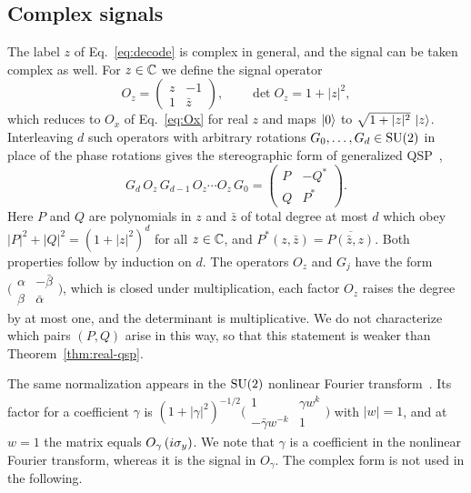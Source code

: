 \subsection{Complex signals}
\label{subsec:complex}

The label $z$ of Eq.~\eqref{eq:decode} is complex in general, and
the signal can be taken complex as well.  For $z\in\mathbb{C}$ we define
the signal operator
\begin{equation}
	O_z=\begin{pmatrix} z & -1 \\ 1 & \bar z\end{pmatrix},
	\qquad \det O_z=1+|z|^2,
	\label{eq:Oz}
\end{equation}
which reduces to $O_x$ of Eq.~\eqref{eq:Ox} for real $z$ and maps
$\ket{0}$ to $\sqrt{1+|z|^2}\,\ket{z}$.  Interleaving $d$ such
operators with arbitrary rotations $G_0,\dots,G_d\in\mathrm{SU}(2)$ in
place of the phase rotations gives the stereographic form of
generalized QSP~\cite{MotlaghWiebe2023},
\begin{equation}
	G_d\,O_z\,G_{d-1}\,O_z\cdots O_z\,G_0
	=\begin{pmatrix} P & -Q^*\\ Q & P^*\end{pmatrix}.
	\label{eq:gen-qsp-form}
\end{equation}
Here $P$ and $Q$ are polynomials in $z$ and $\bar z$ of total
degree at most $d$ which obey $|P|^2+|Q|^2=(1+|z|^2)^d$ for all
$z\in\mathbb{C}$, and $P^*(z,\bar z)=\overline{P(\bar z,z)}$.  Both
properties follow by induction on $d$.  The operators $O_z$ and
$G_j$ have the form
$\bigl(\begin{smallmatrix}\alpha&-\bar\beta\\
\beta&\bar\alpha\end{smallmatrix}\bigr)$, which is closed under
multiplication, each factor $O_z$ raises the degree by at most
one, and the determinant is multiplicative.  We do not
characterize which pairs $(P,Q)$ arise in this way, so that this
statement is weaker than Theorem~\ref{thm:real-qsp}.

The same normalization appears in the $\mathrm{SU}(2)$ nonlinear Fourier
transform~\cite{AlexisMnatsakanyanThiele2024,AlexisBeckerEtAl2026,Laneve2025b}.
Its factor for a coefficient $\gamma$ is
$(1+|\gamma|^2)^{-1/2}\bigl(\begin{smallmatrix}1&\gamma w^k\\
-\bar\gamma w^{-k}&1\end{smallmatrix}\bigr)$ with $|w|=1$, and at
$w=1$ the matrix equals $O_\gamma\,(i\sigma_y)$.  We note that
$\gamma$ is a coefficient in the nonlinear Fourier transform,
whereas it is the signal in $O_\gamma$.  The complex form is not
used in the following.
